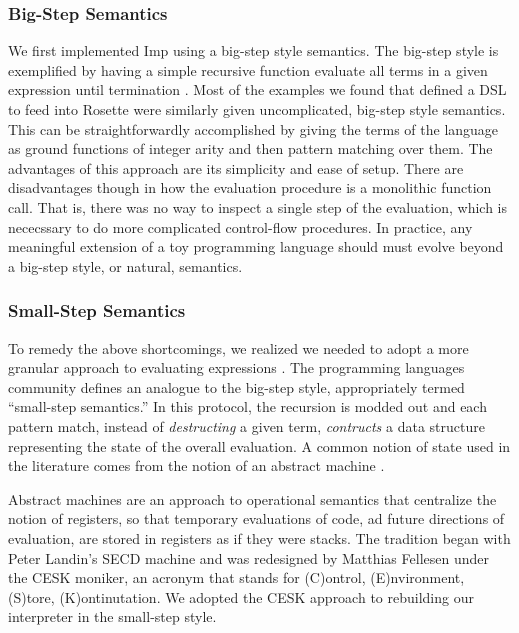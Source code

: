 \subsubsection{Big-Step Semantics}
We first implemented Imp using a big-step style semantics. The big-step style is exemplified by having a simple recursive function evaluate all terms in a given expression until termination \cite{huttel2010}.  Most of the examples we found that defined a DSL to feed into Rosette were similarly given uncomplicated, big-step style semantics.  This can be straightforwardly accomplished by giving the terms of the language as ground functions of integer arity and then pattern matching over them.  The advantages of this approach are its simplicity and ease of setup.  There are disadvantages though in how the evaluation procedure is a monolithic function call.  That is, there was no way to inspect a single step of the evaluation, which is nececssary to do more complicated control-flow procedures.  In practice, any meaningful extension of a toy programming language should must evolve beyond a big-step style, or natural, semantics.

\subsubsection{Small-Step Semantics}
To remedy the above shortcomings, we realized we needed to adopt a more granular approach to evaluating expressions \cite{fernandez2004}.  The programming languages community defines an analogue to the big-step style, appropriately termed ``small-step semantics.''  In this protocol, the recursion is modded out and each pattern match, instead of \emph{destructing} a given term, \emph{contructs} a data structure representing the state of the overall evaluation.  A common notion of state used in the literature comes from the notion of an abstract machine \cite{huttel2010}.

Abstract machines are an approach to operational semantics that centralize the notion of registers, so that temporary evaluations of code, ad future directions of evaluation, are stored in registers as if they were stacks.   The tradition began with Peter Landin's SECD machine and was redesigned by Matthias Fellesen under the CESK moniker, an acronym that stands for (C)ontrol, (E)nvironment, (S)tore, (K)ontinutation.  We adopted the CESK approach to rebuilding our interpreter in the small-step style.

